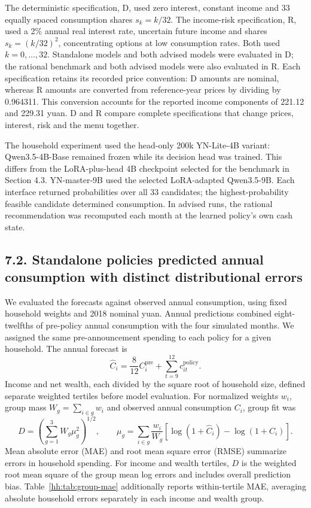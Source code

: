 The deterministic specification, D, used zero interest, constant income and 33 equally spaced consumption shares $s_k=k/32$. The income-risk specification, R, used a 2\% annual real interest rate, uncertain future income and shares $s_k=(k/32)^2$, concentrating options at low consumption rates. Both used $k=0,\ldots,32$. Standalone models and both advised models were evaluated in D; the rational benchmark and both advised models were also evaluated in R. Each specification retains its recorded price convention: D amounts are nominal, whereas R amounts are converted from reference-year prices by dividing by 0.964311. This conversion accounts for the reported income components of 221.12 and 229.31 yuan. D and R compare complete specifications that change prices, interest, risk and the menu together.

The household experiment used the head-only 200k YN-Lite-4B variant: Qwen3.5-4B-Base remained frozen while its decision head was trained. This differs from the LoRA-plus-head 4B checkpoint selected for the benchmark in Section 4.3. YN-master-9B used the selected LoRA-adapted Qwen3.5-9B. Each interface returned probabilities over all 33 candidates; the highest-probability feasible candidate determined consumption. In advised runs, the rational recommendation was recomputed each month at the learned policy's own cash state.

\clearpage
\subsection*{7.2. Standalone policies predicted annual consumption with distinct distributional errors}

We evaluated the forecasts against observed annual consumption, using fixed household weights and 2018 nominal yuan. Annual predictions combined eight-twelfths of pre-policy annual consumption with the four simulated months. We assigned the same pre-announcement spending to each policy for a given household. The annual forecast is
\begin{equation}
 \widehat C_i=\frac{8}{12}C_i^{\mathrm{pre}}+\sum_{t=9}^{12}c_{it}^{\mathrm{policy}}.
 \label{hh:eq:annual}
\end{equation}
Income and net wealth, each divided by the square root of household size, defined separate weighted tertiles before model evaluation. For normalized weights $w_i$, group mass $W_g=\sum_{i\in g}w_i$ and observed annual consumption $C_i$, group fit was
\begin{equation}
 D=\left(\sum_{g=1}^{3}W_g\mu_g^2\right)^{1/2},\qquad
 \mu_g=\sum_{i\in g}\frac{w_i}{W_g}\left[\log(1+\widehat C_i)-\log(1+C_i)\right].
 \label{hh:eq:group}
\end{equation}
Mean absolute error (MAE) and root mean square error (RMSE) summarize errors in household spending. For income and wealth tertiles, $D$ is the weighted root mean square of the group mean log errors and includes overall prediction bias. Table~\ref{hh:tab:group-mae} additionally reports within-tertile MAE, averaging absolute household errors separately in each income and wealth group.

